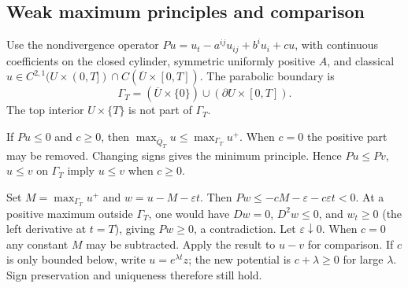 \subsection{Weak maximum principles and comparison}
Use the nondivergence operator
$Pu=u_t-a^{ij}u_{ij}+b^iu_i+cu$, with continuous coefficients on the
closed cylinder, symmetric uniformly positive $A$, and classical
$u\in C^{2,1}(U\times(0,T])\cap C(\overline U\times[0,T])$.
The parabolic boundary is
\[
 \Gamma_T=(\overline U\times\{0\})\cup(\partial U\times[0,T]).
\]
The top interior $U\times\{T\}$ is not part of $\Gamma_T$.
\Needspace{55mm}
\begin{theorem}
If $Pu\leq0$ and $c\geq0$, then
$\max_{\overline Q_T}u\leq\max_{\Gamma_T}u^+$.
When $c=0$ the positive part may be removed. Changing signs gives the
minimum principle. Hence $Pu\leq Pv$, $u\leq v$ on $\Gamma_T$ imply
$u\leq v$ when $c\geq0$.
\end{theorem}
\begin{expandedproof}
Set $M=\max_{\Gamma_T}u^+$ and $w=u-M-\varepsilon t$.
Then $Pw\leq-cM-\varepsilon-c\varepsilon t<0$.
At a positive maximum outside $\Gamma_T$, one would have $Dw=0$,
$D^2w\leq0$, and $w_t\geq0$ (the left derivative at $t=T$), giving
$Pw\geq0$, a contradiction. Let $\varepsilon\downarrow0$.
When $c=0$ any constant $M$ may be subtracted. Apply the result to
$u-v$ for comparison. If $c$ is only bounded below, write
$u=e^{\lambda t}z$; the new potential is $c+\lambda\geq0$ for large
$\lambda$. Sign preservation and uniqueness therefore still hold.
\end{expandedproof}
\Needspace{55mm}

\Needspace{55mm}
